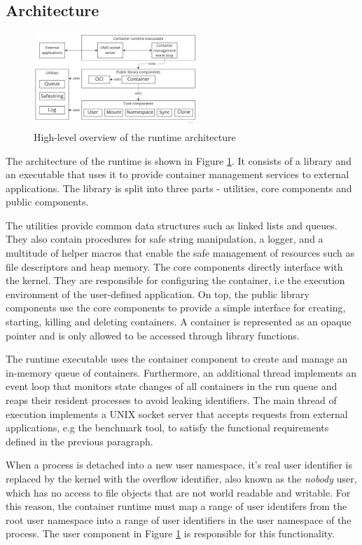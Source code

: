 \subsection{Architecture}
\begin{figure}[H]
    \centering
    \includegraphics[width=0.55\textwidth]{images/concept/runtime-arch-overview.jpg}
    \caption{High-level overview of the runtime architecture}
    \label{images:concept/runtime-arch-overview.jpg}
\end{figure}
The architecture of the runtime is shown in Figure \ref{images:concept/runtime-arch-overview.jpg}.
It consists of a library and an executable that uses it to provide container 
management services to external applications. The library is split into three parts - utilities,
core components and public components. 

The utilities provide common data structures such as 
linked lists and queues. They also contain procedures for safe string manipulation, a logger,
and a multitude of helper macros that enable the safe management of resources such as file descriptors 
and heap memory. The core components directly interface with the kernel. 
They are responsible for configuring the container, 
i.e the execution environment of the user-defined application. On top, the public library 
components use the core components to provide a 
simple interface for creating, starting, killing and deleting containers. A container 
is represented as an opaque pointer and is only allowed to be accessed through library functions.

The runtime executable uses the container component to create and manage an in-memory queue 
of containers. Furthermore, an additional thread implements an event loop that monitors state changes of all containers 
in the run queue and reaps their resident processes to avoid leaking identifiers.
The main thread of execution implements a UNIX socket server that accepts requests
from external applications, e.g the benchmark tool, to satisfy the functional requirements
defined in the previous paragraph.

When a process is detached into a new user namespace, it's real user identifier is replaced by the kernel 
with the overflow identifier, also known as the \textit{nobody} user, which has no access to 
file objects that are not world readable and writable. 
For this reason, the container runtime must map a range of user identifers from the root user namespace 
into a range of user identifiers in the user namespace of the process. The user component in Figure 
\ref{images:concept/runtime-arch-overview.jpg} is responsible for this functionality. 

